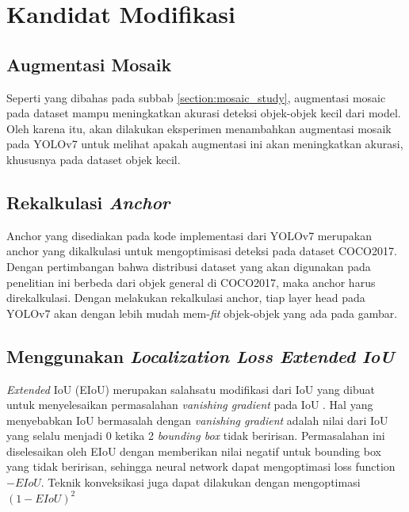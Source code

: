 \section{Kandidat Modifikasi}
\label{section:modificationcandidates}
  \subsection{Augmentasi Mosaik}
    Seperti yang dibahas pada subbab \ref{section:mosaic_study}, augmentasi mosaic pada dataset mampu meningkatkan akurasi deteksi objek-objek kecil dari model.
    Oleh karena itu, akan dilakukan eksperimen menambahkan augmentasi mosaik pada YOLOv7 untuk melihat apakah augmentasi ini akan meningkatkan akurasi, khususnya pada dataset objek kecil.
  \subsection{Rekalkulasi \emph{Anchor}}
    Anchor yang disediakan pada kode implementasi dari YOLOv7 merupakan anchor yang dikalkulasi untuk mengoptimisasi deteksi pada dataset
    COCO2017. Dengan pertimbangan bahwa distribusi dataset yang akan digunakan pada penelitian ini berbeda dari objek general di COCO2017,
    maka anchor harus direkalkulasi. Dengan melakukan rekalkulasi anchor, tiap layer head pada YOLOv7 akan dengan lebih mudah mem-\emph{fit}
    objek-objek yang ada pada gambar.

    \subsection{Menggunakan \emph{Localization Loss Extended IoU} }
      \emph{Extended} IoU (EIoU) merupakan salahsatu modifikasi dari
      IoU yang dibuat untuk menyelesaikan permasalahan \emph{vanishing gradient}
      pada IoU \parencite{eiou}. Hal yang menyebabkan IoU bermasalah dengan \emph{vanishing gradient}
      adalah nilai dari IoU yang selalu menjadi 0 ketika 2 \emph{bounding box} tidak beririsan.
      Permasalahan ini diselesaikan oleh EIoU dengan memberikan nilai negatif untuk 
      bounding box yang tidak beririsan, sehingga neural network dapat mengoptimasi loss function $-EIoU$.
      Teknik konveksikasi juga dapat dilakukan dengan mengoptimasi $(1-EIoU)^2$

